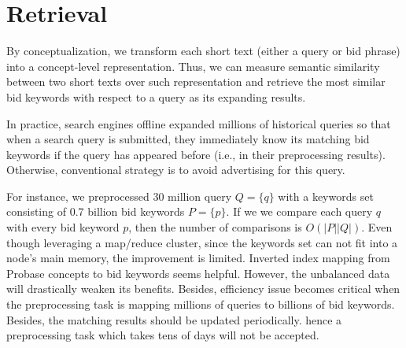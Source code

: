 \section{Retrieval}
\label{sec:retrieval}
By conceptualization, we transform each short text (either a query or
        bid phrase) into a concept-level representation. Thus, we can measure semantic similarity between two short
texts over such representation and retrieve the most similar bid
keywords with respect to a query as its expanding results.


In practice, search engines offline expanded millions of historical
queries so that when a search query is submitted, they immediately
know its matching bid keywords if the query has appeared before (i.e.,
        in their preprocessing results). Otherwise, conventional
strategy is to avoid advertising for this query.


For instance, we preprocessed 30 million query $Q=\{q\}$ with a
keywords set consisting of 0.7 billion bid keywords $P=\{p\}$.  If we
we compare each query $q$ with every bid keyword $p$, then the
number of comparisons is $O(\vert{}P\vert{}\vert{}Q\vert{})$. Even
though leveraging a map/reduce cluster, since the keywords set can not
fit into a node's main memory, the improvement is limited.  Inverted
index mapping from Probase concepts to bid keywords seems helpful.
However, the unbalanced data will drastically weaken its benefits.
Besides, efficiency issue becomes critical when the preprocessing task is
mapping millions of queries to billions of bid keywords. Besides, the
matching results should be updated periodically. hence a preprocessing
task which takes tens of days will not be accepted.



